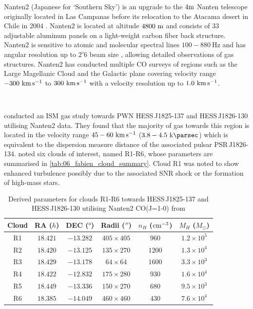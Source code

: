 Nanten2 (Japanese for `Southern Sky') is an upgrade to the $4\si{\meter}$ Nanten telescope originally located in Las Campanas before its relocation to the Atacama desert in Chile in 2004 \citep{2006IAUSS...1E..21F}. Nanten2 is located at altitude $4800~\si{\meter}$ and consists of 33 adjustable aluminum panels on a light-weight carbon fiber back structure. Nanten2 is sensitive to atomic and molecular spectral lines  $100-880~\si{\hertz}$ and has angular resolution up to $2'6$ beam size \citep{2001PASJ...53L..45M}, allowing detailed observations of gas structures. Nanten2 has conducted multiple CO surveys of regions such as the Large Magellanic Cloud \citep{Kawamura_2009} and the Galactic plane \citep{2004ASPC..317...59M} covering velocity range $-300~\si{\kilo\meter\per\second}$ to $300~\si{\kilo\meter\per\second}$ with a velocity resolution up to $1.0~\si{\kilo\meter\per\second}$.
\par~\par
\cite{2016MNRAS.458.2813V} conducted an ISM gas study towards PWN \mbox{HESS\,J1825-137} and \mbox{HESS\,J1826-130} utilising Nanten2 data. They found that the majority of gas towards this region is located in the velocity range $45-60~\si{\kilo\meter\per\second}$ ($3.8-4.5~\kpc$) which is equivalent to the dispersion measure distance of the associated pulsar \mbox{PSR\,J1826-134}. \cite{2016MNRAS.458.2813V} noted six clouds of interest, named R1-R6, whose parameters are summarised in \autoref{tab:06_fabien_cloud_summary}. Cloud R1 was noted to show enhanced turbulence possibly due to the associated SNR shock or the formation of high-mass stars.
\begin{table}[h!]
    \caption{Derived parameters for clouds R1-R6 towards \mbox{HESS\,J1825-137} and \mbox{HESS\,J1826-130} utilising Nanten2 CO(J=1-0) from \cite{2016MNRAS.458.2813V}}
    \begin{threeparttable}
    \centering
    \begin{tabular}{cccccc}
        \toprule
        Cloud & RA ($\si{h}$) & DEC ($\si{\degree}$)& Radii ($''$) & $n_H$ ($\si{\per\centi\meter\cubed}$) & $M_H$ ($M_\odot$) \\
        \midrule
        R1 & $18.421$ & $-13.282$ & $405\times 405$ & $960$ & $1.2\times 10^5$ \\
        R2 & $18.420$ & $-13.125$ & $135\times 270$ & $1200$ & $1.3\times 10^4$ \\
        R3 & $18.429$ & $-13.178$ & $64\times 64$ & $1600$ & $3.3\times 10^3$ \\
        R4 & $18.422$ & $-12.832$ & $175\times 280$ & $930$ & $1.6\times 10^4$ \\
        R5 & $18.449$ & $-13.336$ & $150\times 270$ & $680$ & $9.5\times 10^3$  \\
        R6 & $18.385$ & $-14.049$ & $460\times 460$ & $430$  & $7.6\times 10^4$ \\
        \bottomrule
    \end{tabular}
    \end{threeparttable}
    \label{tab:06_fabien_cloud_summary}
\end{table}
